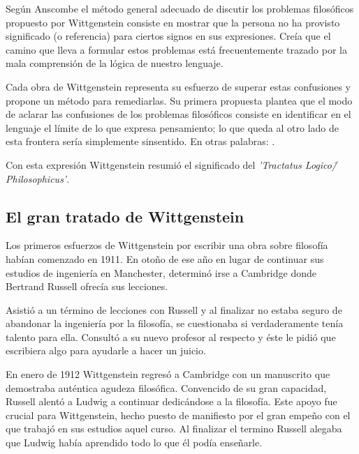 Según Anscombe el método general adecuado de discutir los problemas filosóficos
propuesto por Wittgenstein consiste en mostrar que la persona no ha provisto
significado (o referencia) para ciertos signos en sus expresiones.\autocite[cf.
p. 151]{IWT} Creía que el camino que lleva a formular estos problemas está
frecuentemente trazado por la mala comprensión de la lógica de nuestro lenguaje.

Cada obra de Wittgenstein representa su esfuerzo de superar estas confusiones y
propone un método para remediarlas. Su primera propuesta plantea que el modo de
aclarar las confusiones de los problemas filosóficos consiste en identificar en
el lenguaje el límite de lo que expresa pensamiento; lo que queda al otro lado
de esta frontera sería simplemente sinsentido. En otras palabras:
.\autocite[prefacio]{tractatus}

Con esta expresión Wittgenstein resumió el significado del \emph{'Tractatus
Logico\=/Philosophicus'}.

\subsection{El gran tratado de Wittgenstein}



Los primeros esfuerzos de Wittgenstein por escribir una obra sobre filosofía
habían comenzado en 1911. En otoño de ese año en lugar de continuar sus estudios
de ingeniería en Manchester, determinó irse a Cambridge donde Bertrand Russell
ofrecía sus lecciones.

Asistió a un término de lecciones con Russell y al finalizar no estaba seguro de
abandonar la ingeniería por la filosofía, se cuestionaba si verdaderamente tenía
talento para ella. Consultó a su nuevo profesor al respecto y éste le pidió que
escribiera algo para ayudarle a hacer un juicio.

En enero de 1912 Wittgenstein regresó a Cambridge con un manuscrito que
demostraba auténtica agudeza filosófica. Convencido de su gran capacidad,
Russell alentó a Ludwig a continuar dedicándose a la filosofía. Este apoyo fue
crucial para Wittgenstein, hecho puesto de manifiesto por el gran empeño con el
que trabajó en sus estudios aquel curso. Al finalizar el termino Russell alegaba
que Ludwig había aprendido todo lo que él podía enseñarle.\autocite[cap. 3 loc
865]{monk}

